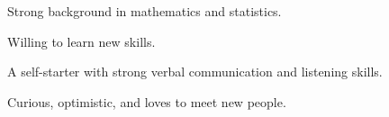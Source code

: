

\begin{cventries}

  \cventry
    {} %
    {} %
    {} %
    {} %
    {
      \begin{cvitems} %
      \item Strong background in mathematics and statistics.
      \item Willing to learn new skills.
      \item A self-starter with strong verbal communication and listening skills.
      \item Curious, optimistic, and loves to meet new people.
      \end{cvitems}
    }


\end{cventries}
